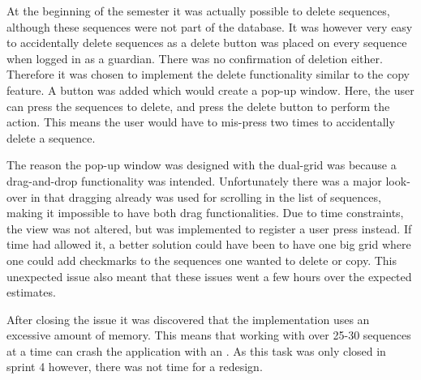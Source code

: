 At the beginning of the semester it was actually possible to delete sequences, although these sequences were not part of the database. It was however very easy to accidentally delete sequences as a delete button was placed on every sequence when logged in as a guardian. There was no confirmation of deletion either.  Therefore it was chosen to implement the delete functionality similar to the copy feature. A button was added which would create a pop-up window. Here, the user can press the sequences to delete, and press the delete button to perform the action. This means the user would have to mis-press two times to accidentally delete a sequence.

The reason the pop-up window was designed with the dual-grid was because a drag-and-drop functionality was intended. Unfortunately there was a major look-over in that dragging already was used for scrolling in the list of sequences, making it impossible to have both drag functionalities. Due to time constraints, the view was not altered, but was implemented to register a user press instead. If time had allowed it, a better solution could have been to have one big grid where one could add checkmarks to the sequences one wanted to delete or copy. This unexpected issue also meant that these issues went a few hours over the expected estimates.

After closing the issue it was discovered that the implementation uses an excessive amount of memory. This means that working with over 25-30 sequences at a time can crash the application with an . As this task was only closed in sprint 4 however, there was not time for a redesign.